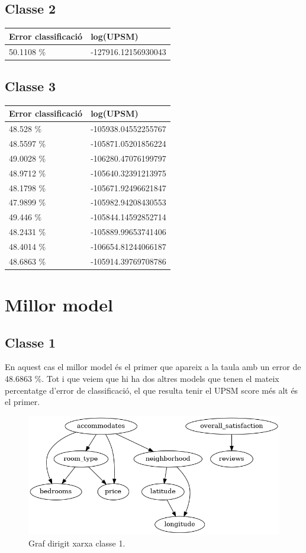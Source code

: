 \documentclass{article}
\begin{document}
\subsection{Classe 2}
\begin{table}[H]
\begin{tabular}{ll}
\hline
Error classificació & log(UPSM)           \\
\hline
50.1108 \%          & -127916.12156930043
\end{tabular}
\end{table}
\subsection{Classe 3}
\begin{table}[H]
\begin{tabular}{ll}
\hline
Error classificació & log(UPSM)           \\
\hline
48.528  \%          & -105938.04552255767 \\
48.5597 \%          & -105871.05201856224 \\
49.0028 \%          & -106280.47076199797 \\
48.9712 \%          & -105640.32391213975 \\
48.1798 \%          & -105671.92496621847 \\
47.9899 \%          & -105982.94208430553 \\
49.446  \%          & -105844.14592852714 \\
48.2431 \%          & -105889.99653741406 \\
48.4014 \%          & -106654.81244066187 \\
48.6863 \%          & -105914.39769708786
\end{tabular}
\end{table}
\section{Millor model}
\subsection{Classe 1}
En aquest cas el millor model és el primer que apareix a la taula amb un error de 48.6863 \%. Tot i que veiem que hi ha dos altres models que tenen el mateix percentatge d'error de classificació, el que resulta tenir el UPSM score més alt és el primer.
\begin{figure}[H]
  \includegraphics[width=\linewidth]{classe1.png}
  \caption{Graf dirigit xarxa classe 1.}
  \label{fig:gp1}
\end{figure}
\end{document}
